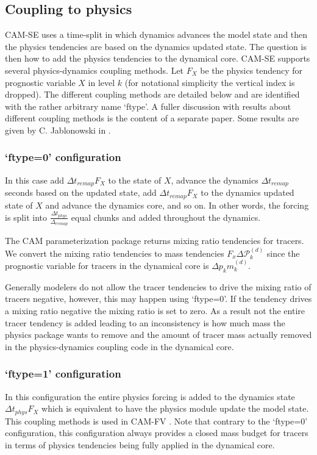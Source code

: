\documentclass{agujournal}
\begin{document}
{\subsection{Coupling to physics}
CAM-SE uses a time-split {\color{red}{[(CHECK if it is process or time split)]}} in which dynamics advances the model state and then the physics tendencies are based on the dynamics updated state. The question is then how to add the physics tendencies to the dynamical core. CAM-SE supports several physics-dynamics coupling methods. Let $F_X$ be the physics tendency for prognostic variable $X$ in level $k$ (for notational simplicity the vertical index is dropped). The different coupling methods are detailed below and are identified with the rather arbitrary name `ftype'. A fuller discussion with results about different coupling methods is the content of a separate paper. Some results are given by C. Jablonowski in \cite[][; see section 6]{GetAl2016}.
\subsubsection{`ftype=0' configuration}
In this case add $\Delta t_{remap}F_X$ to the state of $X$, advance the dynamics $\Delta t_{remap}$ seconds based on the updated state, add $\Delta t_{remap}F_X$ to the dynamics updated state of $X$ and advance the dynamics core, and so on. In other words, the forcing is split into $\frac{\Delta t_{phys}}{\Delta_{remap}}$ equal chunks and added throughout the dynamics. 

The CAM parameterization package returns mixing ratio tendencies for tracers. We convert the mixing ratio tendencies to mass tendencies $F_x \Delta \mathcal{P}^{(d)}_k$ since the prognostic variable for tracers in the dynamical core is $\Delta p_k m^{(d)}_k$.

Generally modelers do not allow the tracer tendencies to drive the mixing ratio of tracers negative, however, this may happen using `ftype=0'. If the tendency drives a mixing ratio negative the mixing ratio is set to zero. As a result not the entire tracer tendency is added leading to an inconsistency is how much mass the physics package wants to remove and the amount of tracer mass actually removed in the physics-dynamics coupling code in the dynamical core.
\subsubsection{`ftype=1' configuration}
In this configuration the entire physics forcing is added to the dynamics state $\Delta t_{phys}F_X$ which is equivalent to have the physics module update the model state. This coupling methods is used in CAM-FV \citep{L2004MWR}. Note that contrary to the `ftype=0' configuration, this configuration always provides a closed mass budget for tracers in terms of physics tendencies being fully applied in the dynamical core.
}
\end{document}
